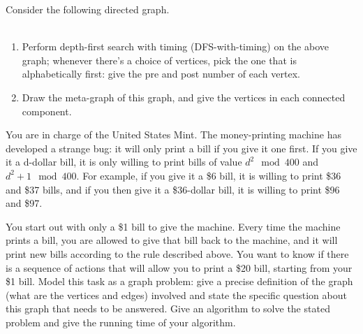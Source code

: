 \documentclass[11pt]{article}
\begin{document}
\begin{qunlist}
 Consider the following directed graph.
\\\\

\begin{enumerate}
    \item  Perform depth-first search with timing (DFS-with-timing) on the above graph; whenever there’s a choice of vertices, pick the one that is alphabetically first: give the pre and post number of each vertex.
    \item  Draw the meta-graph of this graph, and give the vertices in each connected component.
\end{enumerate}

You are in charge of the United States Mint. The money-printing machine has developed a strange bug: it will only print a bill if you give it one first. If you give it a d-dollar bill, it is only willing to print bills of
value $d^2 \mod 400$ and $d^2 +1 \mod 400$. For example, if you give it a \$6 bill, it is willing to print \$36 and
\$37 bills, and if you then give it a \$36-dollar bill, it is willing to print  \$96 and \$97. %

You start out with only a \$1 bill to give the machine. Every time the machine prints a bill, you are allowed to give that bill back to the machine, and it will print new bills according to the rule described above. You
want to know if there is a sequence of actions that will allow you to print a \$20 bill, starting from your \$1 bill. Model this task as a graph problem: give a precise definition of the graph (what are the vertices and edges) involved and state the specific question about this graph that needs to be answered. Give an algorithm to solve the stated problem and give the running time of your algorithm.

\end{qunlist}
\end{document}
